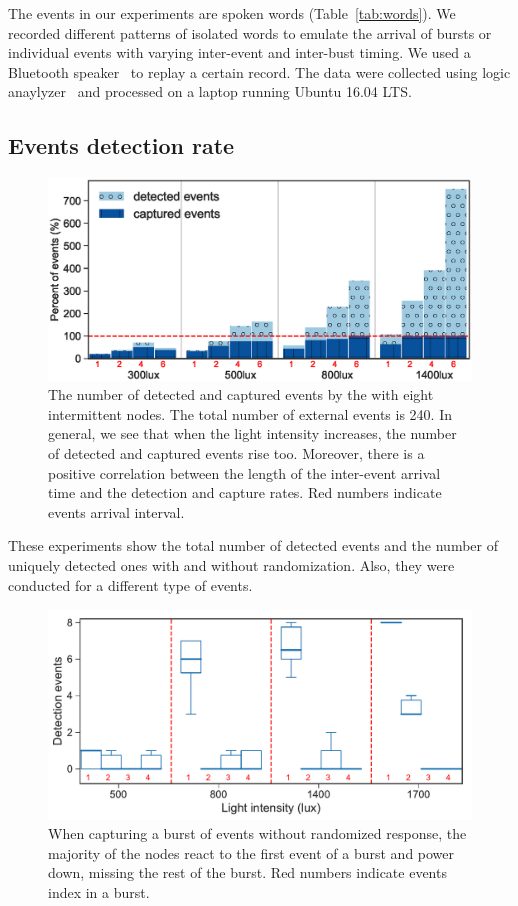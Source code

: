 The events in our experiments are spoken words (Table~\ref{tab:words}). We recorded different patterns of isolated words to emulate the arrival of bursts or individual events with varying inter-event and inter-bust timing. We used a Bluetooth speaker~\cite{jbl} to replay a certain record. The data were collected using logic anaylyzer~\cite{saleae} and processed on a laptop running Ubuntu 16.04 LTS. 


\subsection{Events detection rate}
%
\begin{figure}[t]
		\centering
	    \includegraphics[width=\columnwidth]{figures/regular_events_capture_rate.eps}
		\caption{The number of detected and captured events by the \fullcim with eight intermittent nodes. The total number of external events is 240. In general, we see that when the light intensity increases, the number of detected and captured events rise too. Moreover, there is a positive correlation between the length of the inter-event arrival time and the detection and capture rates. Red numbers indicate events arrival interval.}
    	\label{fig:events_detection_rate}
\end{figure} 
These experiments show the total number of detected events and the number of uniquely detected ones with and without randomization. Also, they were conducted for a different type of events. 
%
\begin{figure}[t]
    \includegraphics[width=\columnwidth]{figures/events_burst_problem.pdf}
	\caption{When capturing a burst of events without randomized response, the majority of the nodes react to the first event of a burst and power down, missing the rest of the burst. Red numbers indicate events index in a burst.}
    \label{fig:events_burst_problem}
\end{figure}


